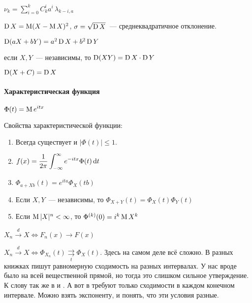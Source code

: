 \documentclass[12pt,timbord]{../../../notes}
\begin{document}
{\prop\label{prop:prob::moments::conn} $\displaystyle\nu_k=\sum_{i=0}^k C_k^i a^i \,\lambda_{k-i,a}$}

\begin{defn}[Дисперсия]\label{defn:prob::moments::var}
  $\operatorname{\mathrm D} X = \operatorname{\mathrm M} (X-\operatorname{\mathrm M} X)^2$, $\sigma = \sqrt{\operatorname{\mathrm D} X}$~--- среднеквадратичное отклонение.
\end{defn}

\begin{prop}\label{prop:prob::moments::varprop}
  \item $\operatorname{\mathrm D}(a X + b Y) = a^2 \operatorname{\mathrm D} X + b^2 \operatorname{\mathrm D} Y$
  \item если $X,Y$~--- независимы, то $\operatorname{\mathrm D} (XY) = \operatorname{\mathrm D} X \cdot \operatorname{\mathrm D} Y$
  \item $\operatorname{\mathrm D}(X+C) = \operatorname{\mathrm D} X$
\end{prop}

\paragraph{Характеристическая функция}
\label{par:prop::charfun}

\begin{defn}\label{defn:prob::moments::charfun}
  $\displaystyle \Phi(t) = \operatorname{\mathrm M} e^{itx}$
\end{defn}

\begin{prop}\label{prop:prob::charfun::charfun}
  Свойства характеристической функции:
  \begin{enumerate}
    \item Всегда существует и $|\Phi(t)| \leqslant 1$.
    \item $f(x) = \dfrac{1}{2\pi} \displaystyle\int_{-\infty}^\infty e^{-itx} \Phi(t) \,\mathrm{d} t $
    \item $\Phi_{a + Xb} (t) = e^{ita} \Phi_X (tb)$
    \item Если $X,Y$~--- независимы, то $\Phi_{X+Y}(t)=  \Phi_X(t) \Phi_Y(t)$
    \item Если $\operatorname{\mathrm M} |X|^n < \infty$, то $\Phi^{(k)}(0)=  i^k \operatorname{\mathrm M} X^k$
  \end{enumerate}
\end{prop}
\begin{defn}\label{defn:prob::charfun::distconv}
  $X_n \xrightarrow{d} X \Leftrightarrow F_n(x) \to F(x)$ 
\end{defn}
\begin{thrm}\label{thrm:prob::charfun::contchar}
  $X_n \xrightarrow{d} X \Leftrightarrow \Phi_{X_n} (t)
  \underset{t}{\rightrightarrows} \Phi_X(t)$.
  Здесь на самом деле всё сложно. В разных книжках пишут равномерную сходимость на разных
  интервалах. У нас вроде было на всей вещественной прямой, но тогда это слишком сильное
  утверждение. К слову так же в \cite{chernova1} и \cite{shiriaev}. А вот в \cite{msu} требуют
  только сходимости в каждом конечном интервале. Можно взять экспоненту, и понять, что эти
  условия разные. 
\end{thrm}
\end{document}
